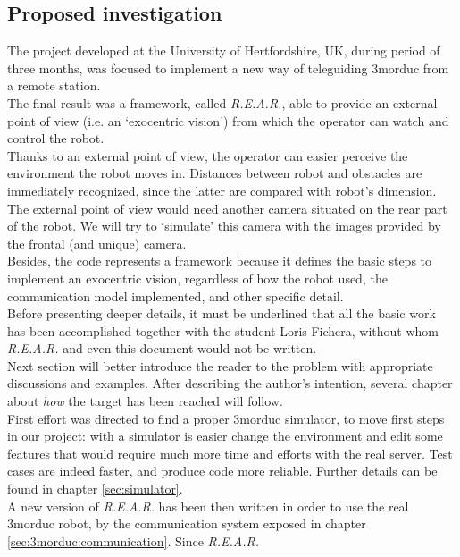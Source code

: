 \subsection{Proposed investigation}
\label{sec:proposed_investigation}

The project developed at the University of Hertfordshire,
UK, during period of three months, was focused to implement
a new way of teleguiding 3morduc from a remote station.
\\
The final result was a framework, called \textit{R.E.A.R.},
able to provide an external point of view (i.e. an `exocentric
vision') from which the operator
can watch and control the robot.
\\
Thanks to an external point of view, the operator can easier
perceive the environment the robot moves in. Distances between
robot and obstacles are immediately recognized, since the latter
are compared with robot's dimension.
\\
The external point of view would need another camera situated
on the rear part of the robot. We will try to `simulate' this
camera with the images provided by the frontal (and unique)
camera.
\\
Besides, the code represents a framework because it defines the basic
steps to implement an exocentric vision, regardless of how the
robot used, the communication model implemented, and other
specific detail.
\\
Before presenting deeper details, it must be underlined that
all the basic work has been accomplished together with the
student Loris Fichera, without whom \textit{R.E.A.R.} and even
this document would not be written.
\\
Next section will better introduce the reader to the problem with
appropriate discussions and examples. After describing
the author's intention, several chapter about \textit{how} the
target has been reached will follow.
\\
First effort was directed to find a proper 3morduc simulator,
to move first steps in our project: with a simulator is easier
change the environment and edit some features that would require
much more time and efforts with the real server. Test cases are
indeed faster, and produce code more reliable. Further details
can be found in chapter \ref{sec:simulator}.
\\
A new version of \textit{R.E.A.R.} has been then written in order
to use the real 3morduc robot, by the communication system exposed
in chapter \ref{sec:3morduc:communication}. Since \textit{R.E.A.R.}
